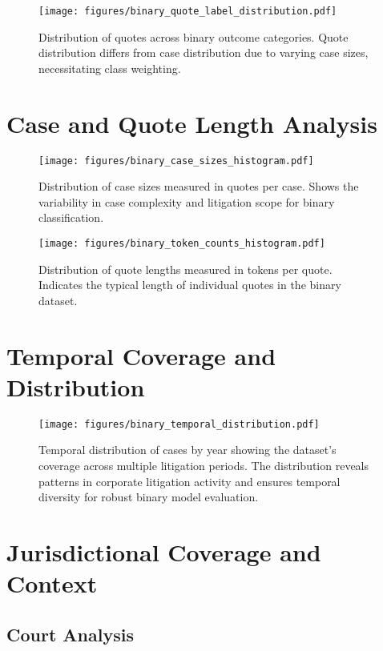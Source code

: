 \documentclass[11pt,a4paper]{article}
\begin{document}
\begin{figure}[H]
\centering
\texttt{[image: figures/binary\_quote\_label\_distribution.pdf]}
\caption{Distribution of quotes across binary outcome categories. Quote distribution differs from case distribution due to varying case sizes, necessitating class weighting.}
\end{figure}

\section{Case and Quote Length Analysis}

\begin{figure}[H]
\centering
\texttt{[image: figures/binary\_case\_sizes\_histogram.pdf]}
\caption{Distribution of case sizes measured in quotes per case. Shows the variability in case complexity and litigation scope for binary classification.}
\end{figure}

\begin{figure}[H]
\centering
\texttt{[image: figures/binary\_token\_counts\_histogram.pdf]}
\caption{Distribution of quote lengths measured in tokens per quote. Indicates the typical length of individual quotes in the binary dataset.}
\end{figure}

\section{Temporal Coverage and Distribution}

\begin{figure}[H]
\centering
\texttt{[image: figures/binary\_temporal\_distribution.pdf]}
\caption{Temporal distribution of cases by year showing the dataset's coverage across multiple litigation periods. The distribution reveals patterns in corporate litigation activity and ensures temporal diversity for robust binary model evaluation.}
\end{figure}

\section{Jurisdictional Coverage and Context}

\subsection{Court Analysis}
\end{document}
